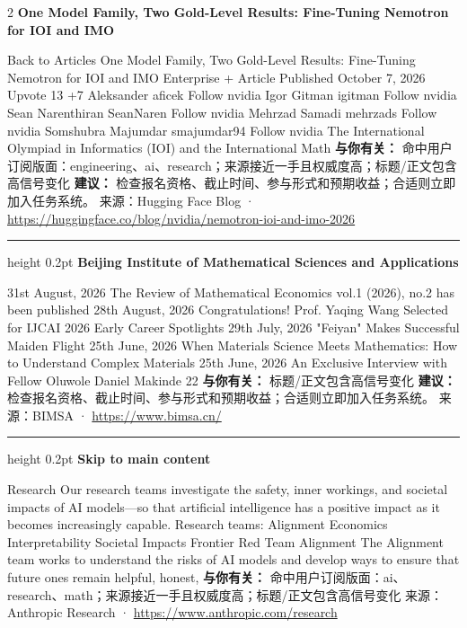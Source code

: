 \documentclass[10.5pt]{ctexart}
\begin{document}
\begin{multicols}{2}
{\large\bfseries One Model Family, Two Gold-Level Results: Fine-Tuning Nemotron for IOI and IMO}\par
Back to Articles One Model Family, Two Gold-Level Results: Fine-Tuning Nemotron for IOI and IMO Enterprise + Article Published October 7, 2026 Upvote 13 +7 Aleksander aficek Follow nvidia Igor Gitman igitman Follow nvidia Sean Narenthiran SeanNaren Follow nvidia Mehrzad Samadi mehrzads Follow nvidia Somshubra Majumdar smajumdar94 Follow nvidia The International Olympiad in Informatics (IOI) and the International Math
\textbf{与你有关：} 命中用户订阅版面：engineering、ai、research；来源接近一手且权威度高；标题/正文包含高信号变化
\textbf{建议：} 检查报名资格、截止时间、参与形式和预期收益；合适则立即加入任务系统。
{\footnotesize\color{ormuted} 来源：Hugging Face Blog · \url{https://huggingface.co/blog/nvidia/nemotron-ioi-and-imo-2026}}
\vspace{2mm}
\hrule height 0.2pt
\vspace{2mm}
{\large\bfseries Beijing Institute of Mathematical Sciences and Applications}\par
31st August, 2026 The Review of Mathematical Economics vol.1 (2026), no.2 has been published 28th August, 2026 Congratulations! Prof. Yaqing Wang Selected for IJCAI 2026 Early Career Spotlights 29th July, 2026 "Feiyan" Makes Successful Maiden Flight 25th June, 2026 When Materials Science Meets Mathematics: How to Understand Complex Materials 25th June, 2026 An Exclusive Interview with Fellow Oluwole Daniel Makinde 22
\textbf{与你有关：} 标题/正文包含高信号变化
\textbf{建议：} 检查报名资格、截止时间、参与形式和预期收益；合适则立即加入任务系统。
{\footnotesize\color{ormuted} 来源：BIMSA · \url{https://www.bimsa.cn/}}
\vspace{2mm}
\hrule height 0.2pt
\vspace{2mm}
{\large\bfseries Skip to main content}\par
Research Our research teams investigate the safety, inner workings, and societal impacts of AI models—so that artificial intelligence has a positive impact as it becomes increasingly capable. Research teams: Alignment Economics Interpretability Societal Impacts Frontier Red Team Alignment The Alignment team works to understand the risks of AI models and develop ways to ensure that future ones remain helpful, honest, 
\textbf{与你有关：} 命中用户订阅版面：ai、research、math；来源接近一手且权威度高；标题/正文包含高信号变化
{\footnotesize\color{ormuted} 来源：Anthropic Research · \url{https://www.anthropic.com/research}}

\end{multicols}
\end{document}
